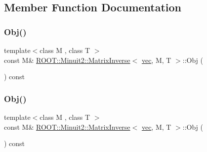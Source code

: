 \subsection{Member Function Documentation}
\mbox{\label{classROOT_1_1Minuit2_1_1MatrixInverse_3_01vec_00_01M_00_01T_01_4_a9d034050e7fbadfbbf24613a54c8ed93}} 
\subsubsection{\texorpdfstring{Obj()}{Obj()}\hspace{0.1cm}{\footnotesize\ttfamily [1/3]}}
{\footnotesize\ttfamily template$<$class M , class T $>$ \\
const M\& \mbox{\hyperlink{classROOT_1_1Minuit2_1_1MatrixInverse}{R\+O\+O\+T\+::\+Minuit2\+::\+Matrix\+Inverse}}$<$ \mbox{\hyperlink{classROOT_1_1Minuit2_1_1vec}{vec}}, M, T $>$\+::Obj (\begin{DoxyParamCaption}{ }\end{DoxyParamCaption}) const\hspace{0.3cm}{\ttfamily [inline]}}

\mbox{\label{classROOT_1_1Minuit2_1_1MatrixInverse_3_01vec_00_01M_00_01T_01_4_a9d034050e7fbadfbbf24613a54c8ed93}} 
\subsubsection{\texorpdfstring{Obj()}{Obj()}\hspace{0.1cm}{\footnotesize\ttfamily [2/3]}}
{\footnotesize\ttfamily template$<$class M , class T $>$ \\
const M\& \mbox{\hyperlink{classROOT_1_1Minuit2_1_1MatrixInverse}{R\+O\+O\+T\+::\+Minuit2\+::\+Matrix\+Inverse}}$<$ \mbox{\hyperlink{classROOT_1_1Minuit2_1_1vec}{vec}}, M, T $>$\+::Obj (\begin{DoxyParamCaption}{ }\end{DoxyParamCaption}) const\hspace{0.3cm}{\ttfamily [inline]}}

